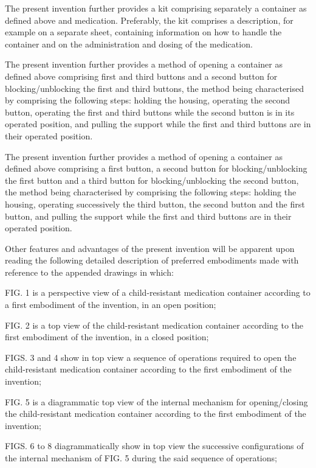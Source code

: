 \documentclass[11pt,a4paper]{article}
\begin{document}
The present invention further provides a kit comprising separately a container as defined above and medication. Preferably, the kit comprises a description, for example on a separate sheet, containing information on how to handle the container and on the administration and dosing of the medication.

The present invention further provides a method of opening a container as defined above comprising first and third buttons and a second button for blocking/unblocking the first and third buttons, the method being characterised by comprising the following steps: holding the housing, operating the second button, operating the first and third buttons while the second button is in its operated position, and pulling the support while the first and third buttons are in their operated position.

The present invention further provides a method of opening a container as defined above comprising a first button, a second button for blocking/unblocking the first button and a third button for blocking/unblocking the second button, the method being characterised by comprising the following steps: holding the housing, operating successively the third button, the second button and the first button, and pulling the support while the first and third buttons are in their operated position.

Other features and advantages of the present invention will be apparent upon reading the following detailed description of preferred embodiments made with reference to the appended drawings in which:

FIG. 1 is a perspective view of a child-resistant medication container according to a first embodiment of the invention, in an open position;

FIG. 2 is a top view of the child-resistant medication container according to the first embodiment of the invention, in a closed position;

FIGS. 3 and 4 show in top view a sequence of operations required to open the child-resistant medication container according to the first embodiment of the invention;

FIG. 5 is a diagrammatic top view of the internal mechanism for opening/closing the child-resistant medication container according to the first embodiment of the invention;

FIGS. 6 to 8 diagrammatically show in top view the successive configurations of the internal mechanism of FIG. 5 during the said sequence of operations;
\end{document}
